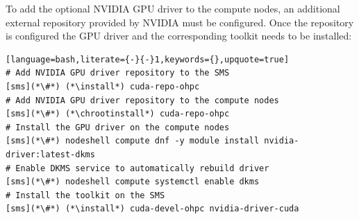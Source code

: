 To add the optional NVIDIA GPU driver to the compute nodes, an
additional external \pkgmgr{} repository provided by NVIDIA
must be configured. Once the repository is configured the
GPU driver and the corresponding toolkit needs to be installed:

\begin{lstlisting}[language=bash,literate={-}{-}1,keywords={},upquote=true]
# Add NVIDIA GPU driver repository to the SMS
[sms](*\#*) (*\install*) cuda-repo-ohpc
# Add NVIDIA GPU driver repository to the compute nodes
[sms](*\#*) (*\chrootinstall*) cuda-repo-ohpc
# Install the GPU driver on the compute nodes
[sms](*\#*) nodeshell compute dnf -y module install nvidia-driver:latest-dkms
# Enable DKMS service to automatically rebuild driver
[sms](*\#*) nodeshell compute systemctl enable dkms
# Install the toolkit on the SMS
[sms](*\#*) (*\install*) cuda-devel-ohpc nvidia-driver-cuda
\end{lstlisting}
